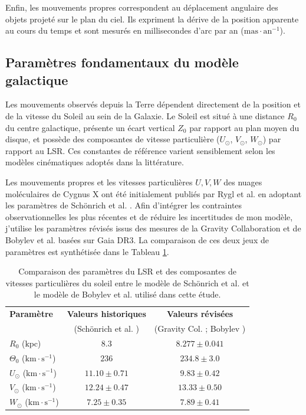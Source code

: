 \documentclass[a4paper, 11pt]{article}
\begin{document}
	
	Enfin, les mouvements propres correspondent au déplacement angulaire des objets projeté sur le plan du ciel. Ils expriment la dérive de la position apparente au cours du temps et sont mesurés en millisecondes d'arc par an ($\mathrm{mas}\cdot\mathrm{an}^{-1}$).
	
	\subsection{Paramètres fondamentaux du modèle galactique}
	Les mouvements observés depuis la Terre dépendent directement de la position et de la vitesse du Soleil au sein de la Galaxie. Le Soleil est situé à une distance $R_0$ du centre galactique, présente un écart vertical $Z_0$ par rapport au plan moyen du disque, et possède des composantes de vitesse particulière ($U_{\odot}$, $V_{\odot}$, $W_{\odot}$) par rapport au LSR. Ces constantes de référence varient sensiblement selon les modèles cinématiques adoptés dans la littérature.
	
	Les mouvements propres et les vitesses particulières $U, V, W$ des nuages moléculaires de Cygnus X ont été initialement publiés par Rygl et al. \cite{rygl2012} en adoptant les paramètres de Schönrich et al. \cite{schonrich2010}. Afin d'intégrer les contraintes observationnelles les plus récentes et de réduire les incertitudes de mon modèle, j'utilise les paramètres révisés issus des mesures de la Gravity Collaboration \cite{gravity2022} et de Bobylev et al. \cite{bobylev2026} basées sur Gaia DR3. La comparaison de ces deux jeux de paramètres est synthétisée dans le Tableau \ref{tab:comparatif_parametres}.
	
	\begin{table}[H]
		\centering
		\small
		\vspace{0.2cm}
		\begin{tabular}{l c c}
			\hline
			\textbf{Paramètre} & \textbf{Valeurs historiques} & \textbf{Valeurs révisées} \\
			& (Schönrich et al. \cite{schonrich2010}) & (Gravity Col. \cite{gravity2022} ; Bobylev \cite{bobylev2026}) \\
			\hline
			$R_0$ ($\mathrm{kpc}$) & $8.3$ & $8.277 \pm 0.041$ \\
			$\Theta_0$ ($\mathrm{km\cdot s^{-1}}$) & $236$ & $234.8 \pm 3.0$ \\
			$U_{\odot}$ ($\mathrm{km\cdot s^{-1}}$) & $11.10 \pm 0.71$ & $9.83 \pm 0.42$ \\
			$V_{\odot}$ ($\mathrm{km\cdot s^{-1}}$) & $12.24 \pm 0.47$ & $13.33 \pm 0.50$ \\
			$W_{\odot}$ ($\mathrm{km\cdot s^{-1}}$) & $7.25 \pm 0.35$ & $7.89 \pm 0.41$ \\
			\hline
		\end{tabular}
		\caption{Comparaison des paramètres du LSR et des composantes de vitesses particulières du soleil entre le modèle de Schönrich et al. et le modèle de Bobylev et al. utilisé dans cette étude.}
		\label{tab:comparatif_parametres}
	\end{table}
	
\end{document}
